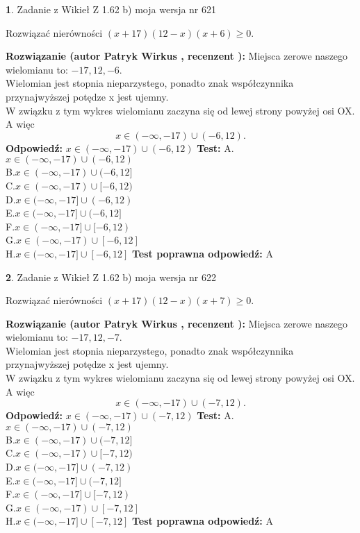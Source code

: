 \documentclass[12pt, a4paper]{article}
\theoremstyle{definition} %
\newtheorem{zad}{}
\newcommand{\zadStart}[1]{\begin{zad}#1\newline}
\newcommand{\zadStop}{\end{zad}}
\newcommand{\rozwStart}[2]{\noindent \textbf{Rozwiązanie (autor #1 , recenzent #2): }\newline}
\newcommand{\rozwStop}{\newline}
\newcommand{\odpStart}{\noindent \textbf{Odpowiedź:}\newline}
\newcommand{\odpStop}{\newline}
\newcommand{\testStart}{\noindent \textbf{Test:}\newline}
\newcommand{\testStop}{\newline}
\newcommand{\kluczStart}{\noindent \textbf{Test poprawna odpowiedź:}\newline}
\newcommand{\kluczStop}{\newline}
\begin{document}
\zadStart{Zadanie z Wikieł Z 1.62 b) moja wersja nr 621}

Rozwiązać nierówności $(x+17)(12-x)(x+6)\ge0$.
\zadStop
\rozwStart{Patryk Wirkus}{}
Miejsca zerowe naszego wielomianu to: $-17, 12, -6$.\\
Wielomian jest stopnia nieparzystego, ponadto znak współczynnika przy\linebreak najwyższej potędze x jest ujemny.\\ W związku z tym wykres wielomianu zaczyna się od lewej strony powyżej osi OX. A więc $$x \in (-\infty,-17) \cup (-6,12).$$
\rozwStop
\odpStart
$x \in (-\infty,-17) \cup (-6,12)$
\odpStop
\testStart
A.$x \in (-\infty,-17) \cup (-6,12)$\\
B.$x \in (-\infty,-17) \cup (-6,12]$\\
C.$x \in (-\infty,-17) \cup [-6,12)$\\
D.$x \in (-\infty,-17] \cup (-6,12)$\\
E.$x \in (-\infty,-17] \cup (-6,12]$\\
F.$x \in (-\infty,-17] \cup [-6,12)$\\
G.$x \in (-\infty,-17) \cup [-6,12]$\\
H.$x \in (-\infty,-17] \cup [-6,12]$
\testStop
\kluczStart
A
\kluczStop



\zadStart{Zadanie z Wikieł Z 1.62 b) moja wersja nr 622}

Rozwiązać nierówności $(x+17)(12-x)(x+7)\ge0$.
\zadStop
\rozwStart{Patryk Wirkus}{}
Miejsca zerowe naszego wielomianu to: $-17, 12, -7$.\\
Wielomian jest stopnia nieparzystego, ponadto znak współczynnika przy\linebreak najwyższej potędze x jest ujemny.\\ W związku z tym wykres wielomianu zaczyna się od lewej strony powyżej osi OX. A więc $$x \in (-\infty,-17) \cup (-7,12).$$
\rozwStop
\odpStart
$x \in (-\infty,-17) \cup (-7,12)$
\odpStop
\testStart
A.$x \in (-\infty,-17) \cup (-7,12)$\\
B.$x \in (-\infty,-17) \cup (-7,12]$\\
C.$x \in (-\infty,-17) \cup [-7,12)$\\
D.$x \in (-\infty,-17] \cup (-7,12)$\\
E.$x \in (-\infty,-17] \cup (-7,12]$\\
F.$x \in (-\infty,-17] \cup [-7,12)$\\
G.$x \in (-\infty,-17) \cup [-7,12]$\\
H.$x \in (-\infty,-17] \cup [-7,12]$
\testStop
\kluczStart
A
\kluczStop
\end{document}
